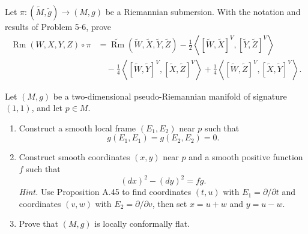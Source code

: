 \begin{exercise}
\label{prob:oneill-formula}
Let $\pi\colon(\widetilde M,\widetilde g)\to(M,g)$ be a Riemannian
submersion. With the notation and results of Problem 5-6, prove
\begin{align*}
\operatorname{Rm}(W,X,Y,Z)\circ\pi
&=\widetilde{\operatorname{Rm}}(\widetilde W,\widetilde X,
  \widetilde Y,\widetilde Z)
-\frac12\left\langle[\widetilde W,\widetilde X]^V,
  [\widetilde Y,\widetilde Z]^V\right\rangle\\
&\quad-\frac14\left\langle[\widetilde W,\widetilde Y]^V,
  [\widetilde X,\widetilde Z]^V\right\rangle
+\frac14\left\langle[\widetilde W,\widetilde Z]^V,
  [\widetilde X,\widetilde Y]^V\right\rangle.
\end{align*}
\end{exercise}

\begin{exercise}
\label{prob:pseudo-riemannian-2d}
Let $(M,g)$ be a two-dimensional pseudo-Riemannian manifold of signature
$(1,1)$, and let $p\in M$.
\begin{enumerate}
\item[(a)] Construct a smooth local frame $(E_1,E_2)$ near $p$ such that
\[
g(E_1,E_1)=g(E_2,E_2)=0.
\]
\item[(b)] Construct smooth coordinates $(x,y)$ near $p$ and a smooth positive
function $f$ such that
\[
(dx)^2-(dy)^2=fg.
\]
\emph{Hint.} Use Proposition A.45 to find coordinates $(t,u)$ with
$E_1=\partial/\partial t$ and coordinates $(v,w)$ with
$E_2=\partial/\partial v$, then set $x=u+w$ and $y=u-w$.
\item[(c)] Prove that $(M,g)$ is locally conformally flat.
\end{enumerate}
\end{exercise}

